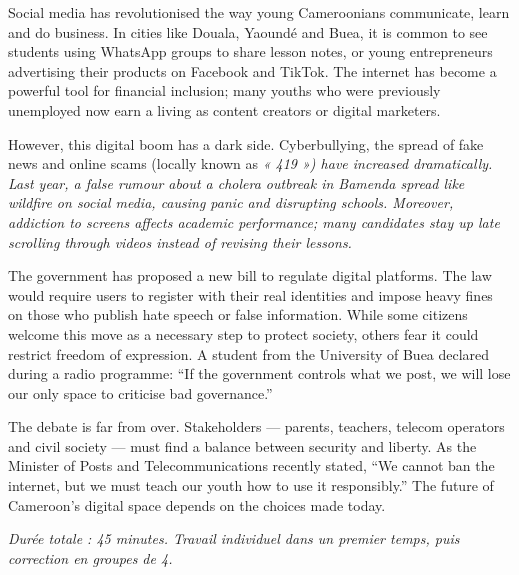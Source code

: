 \documentclass[11pt]{article}
\newcounter{popsec}
\newcounter{popsub}
\newcommand{\courssub}[1]{%
  \stepcounter{popsub}%
  \par\vspace{9pt}\noindent{\popxbold\fontsize{11.5}{13}\selectfont\color{popink}{\color{poporange}\thepopsec.\thepopsub}\hspace{6pt}#1}\par\nopagebreak\vspace{4pt}
}
\newcommand{\eng}[1]{\ifmmode\text{\textit{#1}}\else\begingroup\selectlanguage{english}\itshape #1\endgroup\fi}
\begin{document}
\begin{textebox}
Social media has revolutionised the way young Cameroonians communicate, learn and do business. In cities like Douala, Yaoundé and Buea, it is common to see students using WhatsApp groups to share lesson notes, or young entrepreneurs advertising their products on Facebook and TikTok. The internet has become a powerful tool for financial inclusion; many youths who were previously unemployed now earn a living as content creators or digital marketers.

However, this digital boom has a dark side. Cyberbullying, the spread of fake news and online scams (locally known as \eng{« 419 »}) have increased dramatically. Last year, a false rumour about a cholera outbreak in Bamenda spread like wildfire on social media, causing panic and disrupting schools. Moreover, addiction to screens affects academic performance; many candidates stay up late scrolling through videos instead of revising their lessons.

The government has proposed a new bill to regulate digital platforms. The law would require users to register with their real identities and impose heavy fines on those who publish hate speech or false information. While some citizens welcome this move as a necessary step to protect society, others fear it could restrict freedom of expression. A student from the University of Buea declared during a radio programme: “If the government controls what we post, we will lose our only space to criticise bad governance.”

The debate is far from over. Stakeholders — parents, teachers, telecom operators and civil society — must find a balance between security and liberty. As the Minister of Posts and Telecommunications recently stated, “We cannot ban the internet, but we must teach our youth how to use it responsibly.” The future of Cameroon's digital space depends on the choices made today.
\end{textebox}

\courssub{Consignes}
\emph{Durée totale : 45 minutes. Travail individuel dans un premier temps, puis correction en groupes de 4.}
\end{document}
